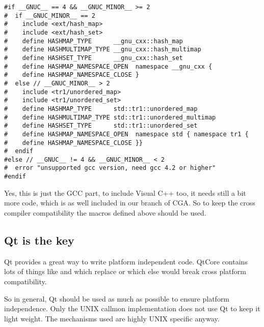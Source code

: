 \begin{verbatim}
#if __GNUC__ == 4 && __GNUC_MINOR__ >= 2
#  if __GNUC_MINOR__ == 2
#    include <ext/hash_map>
#    include <ext/hash_set>
#    define HASHMAP_TYPE      __gnu_cxx::hash_map
#    define HASHMULTIMAP_TYPE __gnu_cxx::hash_multimap
#    define HASHSET_TYPE      __gnu_cxx::hash_set
#    define HASHMAP_NAMESPACE_OPEN  namespace __gnu_cxx {
#    define HASHMAP_NAMESPACE_CLOSE }
#  else // __GNUC_MINOR__ > 2
#    include <tr1/unordered_map>
#    include <tr1/unordered_set>
#    define HASHMAP_TYPE      std::tr1::unordered_map
#    define HASHMULTIMAP_TYPE std::tr1::unordered_multimap
#    define HASHSET_TYPE      std::tr1::unordered_set
#    define HASHMAP_NAMESPACE_OPEN  namespace std { namespace tr1 {
#    define HASHMAP_NAMESPACE_CLOSE }}
#  endif
#else // __GNUC__ != 4 && __GNUC_MINOR__ < 2
#  error "unsupported gcc version, need gcc 4.2 or higher"
#endif
\end{verbatim}

Yes, this is just the GCC part, to include Visual C++ too, it needs still a bit more code, which is as well included in our branch of CGA. So to keep the cross compiler compatibility the macros defined above should be used. 

\subsection{Qt is the key}

Qt provides a great way to write platform independent code. QtCore contains lots of things like  and  which replace  or  which else would break cross platform compatibility.

So in general, Qt should be used as much as possible to ensure platform independence. Only the UNIX callmon implementation does not use Qt to keep it light weight. The mechanisms used are highly UNIX specific anyway. 
